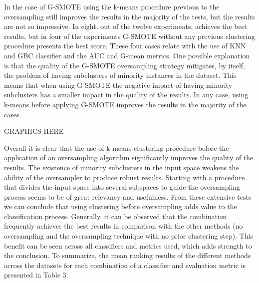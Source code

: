 \documentclass[parskip=full]{scrartcl}
\begin{document}
In the case of G-SMOTE using the k-means procedure previous to the oversampling 
still improves the results in the majority of the tests, but the results are 
not so impressive. In eight, out of the twelve experiments, achieves the best 
results, but in four of the experiments G-SMOTE without any previous clustering 
procedure presents the best score. These four cases relate with the use of KNN 
and GBC classifier and the AUC and G-mean metrics. One possible explanation is 
that the quality of the G-SMOTE oversampling strategy mitigates, by itself, the 
problem of having subclusters of minority instances in the dataset. This means 
that when using G-SMOTE the negative impact of having minority subclusters has 
a smaller impact in the quality of the results. In any case, using k-means 
before applying G-SMOTE improves the results in the majority of the cases.

GRAPHICS HERE

Overall it is clear that the use of k-means clustering procedure before the 
application of an oversampling algorithm significantly improves the quality of 
the results. The existence of minority subclusters in the input space weakens 
the ability of the oversampler to produce robust results. Starting with a 
procedure that divides the input space into several subspaces to guide the 
oversampling process seems to be of great relevancy and usefulness. From these 
extensive tests we can conclude that using clustering before oversampling adds 
value to the classification process. Generally, it can be observed that the 
combination frequently achieves the best results in comparison with the other 
methods (no oversampling and the oversampling technique with no prior 
clustering step). This benefit can be seen across all classifiers and metrics 
used, which adds strength to the conclusion. To summarize, the mean ranking 
results of the different methods across the datasets for each combination of a 
classifier and evaluation metric is presented in Table 3.



\end{document}
